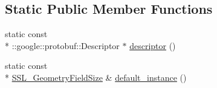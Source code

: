 \subsection*{Static Public Member Functions}
\begin{DoxyCompactItemize}
\item 
static const \\*
\-::google\-::protobuf\-::\-Descriptor $\ast$ \hyperlink{class_s_s_l___geometry_field_size_a8e617e8cf22913dbb4a26aff396367f9}{descriptor} ()
\item 
static const \\*
\hyperlink{class_s_s_l___geometry_field_size}{S\-S\-L\-\_\-\-Geometry\-Field\-Size} \& \hyperlink{class_s_s_l___geometry_field_size_a7d765b9a5c899ea14fc10222ad674c66}{default\-\_\-instance} ()
\end{DoxyCompactItemize}
